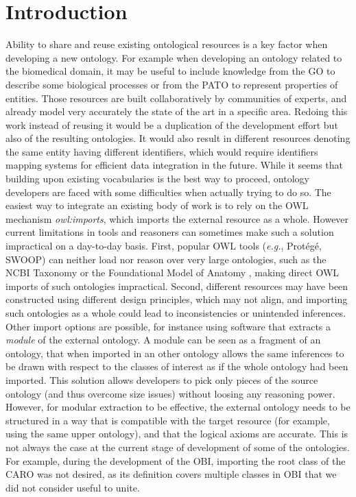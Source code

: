 \documentclass{ao2e}%
\begin{document}
\section{Introduction}

Ability to share and reuse existing ontological resources is a key factor when developing a new ontology.
For example when developing an ontology related to the biomedical domain, it may be useful to include knowledge from the \ac{GO}\cite{GO} to describe some biological processes or from the \ac{PATO}\cite{PATO} to represent properties of entities.
Those resources are built collaboratively by communities of experts, and already model very accurately the state of the art in a specific area.
Redoing this work instead of reusing it would be a duplication of the development effort but also of the resulting ontologies. It would also result in different resources denoting the same entity having different identifiers, which would require identifiers mapping systems for efficient data integration in the future. 
While it seems that building upon existing vocabularies is the best way to proceed, ontology developers are faced with some difficulties when actually trying to do so.
The easiest way to integrate an existing body of work is to rely on the \ac{OWL} \cite{OWL} mechanism \emph{owl:imports}, which imports the external resource as a whole. However current limitations in tools and reasoners can sometimes make such a solution impractical on a day-to-day basis.
First, popular OWL tools (\emph{e.g.}, Prot\'eg\'e, SWOOP) can neither load nor reason %
over very large ontologies, such as the NCBI Taxonomy \cite{NCBI} or the Foundational Model of Anatomy \cite{FMA}, making direct \ac{OWL} imports of such ontologies impractical. 
Second, different resources may have been constructed using different design principles, which may not align, and importing such ontologies as a whole could lead to inconsistencies or unintended inferences.
Other import options are possible, for instance using software that extracts a \emph{module} \cite{Grau} of the external ontology.
A module can be seen as a fragment of an ontology, that when imported in an other ontology allows the same inferences to be drawn with respect to the classes of interest as if the whole ontology had been imported. This solution allows developers to pick only pieces of the source ontology (and thus overcome size issues) without loosing any reasoning power.
However, for modular extraction to be effective, the external ontology needs to be structured in a way that is compatible with the target resource (for example, using the same upper ontology), and that the logical axioms are accurate. 
This is not always the case at the current stage of development of some of the ontologies.
For example, during the development of the \ac{OBI}\cite{OBI}, importing the root class of the \ac{CARO} was not desired, as its definition covers multiple classes in \ac{OBI} that we did not consider useful to unite. 
\end{document}
